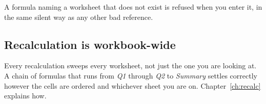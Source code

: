 A formula naming a worksheet that does not exist is refused when you enter it,
in the same silent way as any other bad reference.

\subsection{Recalculation is workbook-wide}

Every recalculation sweeps every worksheet, not just the one you are looking
at. A chain of formulas that runs from \emph{Q1} through \emph{Q2} to
\emph{Summary} settles correctly however the cells are ordered and whichever
sheet you are on. Chapter~\ref{ch:recalc} explains how.
